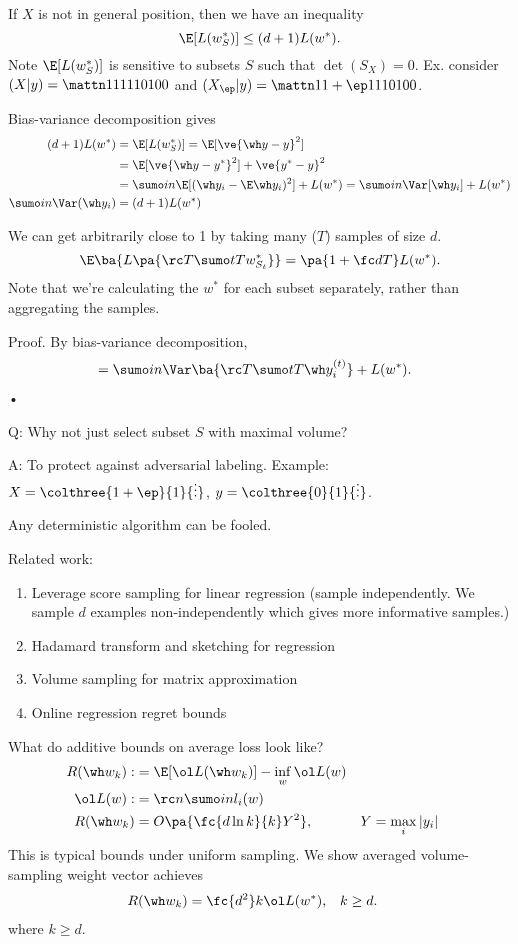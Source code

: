 If $X$ is not in general position, then we have an inequality
$$
\E[L(w_S^*)] \le (d+1) L(w^*).
$$
Note $\E[L(w_S^*)]$ is sensitive to subsets $S$ such that $\det(S_X)=0$. Ex. consider $(X|y) = \mattn 111110100$ and $(X_\ep|y) = \mattn 1{1+\ep}1110100$.

Bias-variance decomposition gives
\begin{align}
(d+1) L(w^*) &= \E[L(w_S^*)] = \E[\ve{\wh y-y}^2]\\
&= \E[\ve{\wh y-y^*}^2] + \ve{y^*-y}^2\\
&=\sumo in \E[(\wh y_i - \E\wh y_i)^2] + L(w^*) = \sumo in \Var[\wh y_i] + L(w^*)\\ 
\sumo in \Var(\wh y_i) &= (d+1)L(w^*)
\end{align}

We can get arbitrarily close to 1 by taking many ($T$) samples of size $d$.
$$
\E\ba{L\pa{\rc T\sumo tT w_{S_t}^*}} = \pa{1+\fc dT} L(w^*).
$$
Note that we're calculating the $w^*$ for each subset separately, rather than aggregating the samples.

Proof. By bias-variance decomposition,
\begin{align}
&=\sumo in \Var\ba{\rc T\sumo tT \wh y_i^{(t)}} + L(w^*) .
\end{align}•

Q: Why not just select subset $S$ with maximal volume? 

A: To protect against adversarial labeling. Example: $X=\colthree{1+\ep}{1}{\vdots}$, $y=\colthree{0}{1}{\vdots}$.

Any deterministic algorithm can be fooled.

Related work:
\begin{enumerate}
\item
Leverage score sampling for linear regression 
(sample independently. We sample $d$ examples non-independently which gives more informative samples.)
\item
Hadamard transform and sketching for regression
\item
Volume sampling for matrix approximation
\item
Online regression regret bounds
\end{enumerate}

What do additive bounds on average loss look like?
\begin{align}
R(\wh w_k):&=\E[\ol L(\wh w_k)] - \inf_w \ol L(w)\\
\ol L(w):&= \rc n \sumo in l_i(w)\\
R(\wh w_k)&= O\pa{\fc{d\ln k}{k}Y^2}, &Y&=\max_i |y_i|
\end{align}
This is typical bounds under uniform sampling. We show averaged volume-sampling weight vector achieves
\begin{align}
R(\wh w_k) & = \fc{d^2}k \ol L(w^*), &k&\ge d.
\end{align}
where $k\ge d$.

